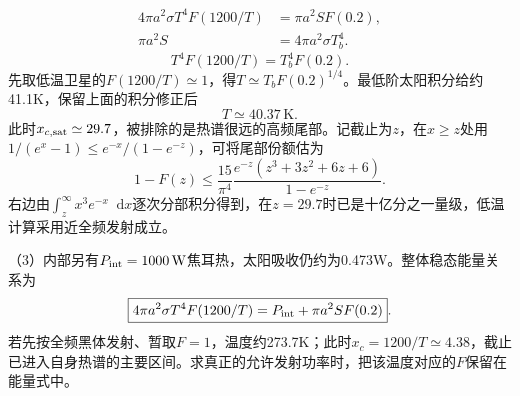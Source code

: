 \documentclass[UTF8,fontset=fandol,a4paper,11pt]{ctexart}
\newcommand{\dd}{\mathop{}\!\mathrm{d}}
\begin{document}
\[
\begin{aligned}
 4\pi a^2\sigma T^4F(1200/T)&=\pi a^2S F(0.2),\\
 \pi a^2S&=4\pi a^2\sigma T_b^4.
\end{aligned}
\]
\[
\boxed{T^4F(1200/T)=T_b^4F(0.2)}.
\]
先取低温卫星的$F(1200/T)\simeq1$，得$T\simeq T_bF(0.2)^{1/4}$。最低阶太阳积分给约41.1K，保留上面的积分修正后
\[
\boxed{T\simeq40.37\,\mathrm K}.
\]
此时$x_{c,\rm sat}\simeq29.7$，被排除的是热谱很远的高频尾部。记截止为$z$，在$x\ge z$处用$1/(e^x-1)\le e^{-x}/(1-e^{-z})$，可将尾部份额估为
\[
 1-F(z)\le\frac{15}{\pi^4}
 \frac{e^{-z}(z^3+3z^2+6z+6)}{1-e^{-z}}.
\]
右边由$\int_z^\infty x^3e^{-x}\dd x$逐次分部积分得到，在$z=29.7$时已是十亿分之一量级，低温计算采用近全频发射成立。

（3）内部另有$P_{\rm int}=1000\,\mathrm W$焦耳热，太阳吸收仍约为0.473W。整体稳态能量关系为
\[
\boxed{4\pi a^2\sigma T^4F(1200/T)
=P_{\rm int}+\pi a^2SF(0.2)}.
\]
若先按全频黑体发射、暂取$F=1$，温度约273.7K；此时$x_c=1200/T\simeq4.38$，截止已进入自身热谱的主要区间。求真正的允许发射功率时，把该温度对应的$F$保留在能量式中。
\end{document}
